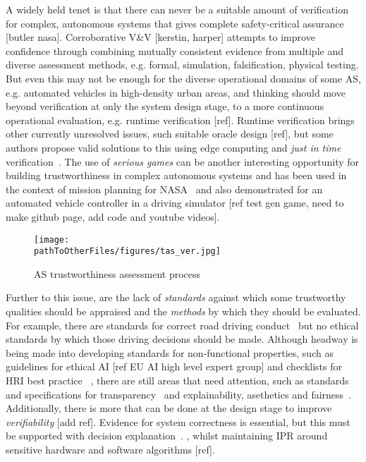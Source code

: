 A widely held tenet is that there can never be a suitable amount of verification for complex, autonomous systems that gives complete safety-critical assurance [butler nasa]. Corroborative V\&V [kerstin, harper] attempts to improve confidence through combining mutually consistent evidence from multiple and diverse assessment methods, e.g. formal, simulation, falsification, physical testing. 
%
But even this may not be enough for the diverse operational domains of some AS, e.g. automated vehicles in high-density urban areas, and thinking should move beyond verification at only the system design stage, to a more continuous operational evaluation, e.g. runtime verification [ref]. Runtime verification brings other currently unresolved issues, such suitable oracle design [ref], but some authors propose valid solutions to this using edge computing and \emph{just in time} verification~\cite{CyRes20,eder2021cyres}. 
%
The use of \emph{serious games} can be another interesting opportunity for building trustworthiness in complex autonomous systems and has been used in the context of mission planning for NASA~\cite{Allen2018} and also demonstrated for an automated vehicle controller in a driving simulator [ref test gen game, need to make github page, add code and youtube videos]. 


\begin{figure*}[]
    \centering
    \texttt{[image: \\pathToOtherFiles/figures/tas\_ver.jpg]}
    \caption{AS trustworthiness assessment process}
    \label{fig:tas_ver}
\end{figure*}


Further to this issue, are the lack of \emph{standards} against which some trustworthy qualities should be appraised and the \emph{methods} by which they should be evaluated. For example, there are standards for correct road driving conduct~\cite{highwayCode} but no ethical standards by which those driving decisions should be made. 
%
Although headway is being made into developing standards for non-functional properties, such as guidelines for ethical AI [ref EU AI high level expert group] and checklists for HRI best practice ~\cite{kraus2022trustworthy}, there are still areas that need attention, such as standards and specifications for transparency~\cite{winfield2021ieee} and explainability, asethetics and fairness~\cite{Abeywickrama2022}. 
%
Additionally, there is more that can be done at the design stage to improve \emph{verifiability} [add ref]. Evidence for system correctness is essential, but this must be supported with decision explanation~\cite{koopman2018toward}. , whilst maintaining IPR around sensitive hardware and software algorithms [ref]. 



